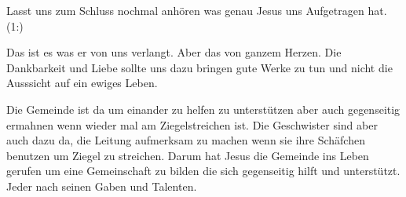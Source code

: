 \documentclass[14pt]{../../inc/mybib}
\begin{document}
    Lasst uns zum Schluss nochmal anhören was genau Jesus uns Aufgetragen hat. (1:) 

    Das ist es was er von uns verlangt. Aber das von ganzem Herzen. Die Dankbarkeit und Liebe sollte uns dazu bringen gute Werke zu tun und nicht die Ausssicht auf ein ewiges Leben.

    Die Gemeinde ist da um einander zu helfen zu unterstützen aber auch gegenseitig ermahnen wenn wieder mal am Ziegelstreichen ist. Die Geschwister sind aber auch dazu da, die Leitung aufmerksam zu machen wenn sie ihre Schäfchen benutzen um Ziegel zu streichen. Darum hat Jesus die Gemeinde ins Leben gerufen um eine Gemeinschaft zu bilden die sich gegenseitig hilft und unterstützt. Jeder nach seinen Gaben und Talenten.\\
    \beten{}

    
    
\end{document}

